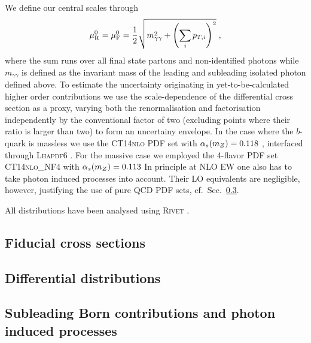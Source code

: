 We define our central scales through
\begin{equation}
  \label{eq:murfdef}
    \mu_{\mathrm{R}}^0 = \mu_{\mathrm{F}}^0 = \frac{1}{2}\sqrt{m^2_{\gamma \gamma} +\left( \sum_i p_{T,i}\right)^2}\;,
\end{equation}
where the sum runs over all final state partons and non-identified photons 
while $m_{\gamma\gamma}$ is defined as the invariant mass of the 
leading and subleading isolated photon defined above.
To estimate the uncertainty originating in yet-to-be-calculated 
higher order contributions we use the scale-dependence of the 
differential cross section as a proxy, varying both the 
renormalisation and factorisation 
independently by the conventional factor of two (excluding points 
where their ratio is larger than two) to form an uncertainy envelope.
In the case where the $b$-quark is massless
we use the \textsc{CT14nlo} PDF set with $\alpha_s(m_Z)=0.118$
\cite{Dulat:2015mca}, interfaced through \textsc{Lhapdf6} \cite{Buckley:2014ana}. 
For the massive case we employed the  4-flavor PDF set \textsc{CT14nlo\_NF4} with $\alpha_s(m_Z)=0.113$
In principle at NLO EW one also has to take photon induced processes 
into account. 
Their LO equivalents are negligible, however, justifying the use of 
pure QCD PDF sets, cf.\ Sec.\ \ref{sec:results:subLO-aind}.


All distributions have been analysed using \textsc{Rivet} \cite{Buckley:2010ar}.

\subsection{Fiducial cross sections}
\label{sec:results:xsecs}

\subsection{Differential distributions}
\label{sec:results:dists}

\subsection{Subleading Born contributions and photon induced processes}
\label{sec:results:subLO-aind}

